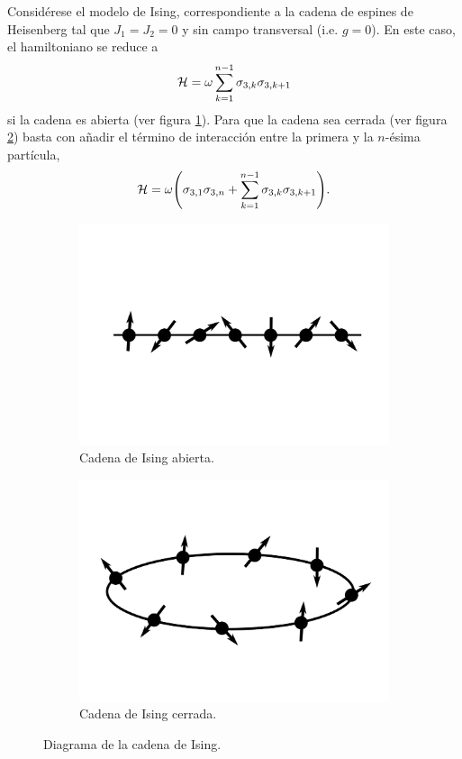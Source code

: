 Considérese el modelo de Ising, correspondiente a la cadena de espines de Heisenberg tal que $J_{1}=J_{2}=0$ y sin campo transversal (i.e. $g=0$). En este caso, el hamiltoniano se reduce a
\begin{equation}
    \mathcal{H}=\omega\sum_{k=1}^{n-1}\sigma_{3,k}\sigma_{3,k+1}\nonumber
\end{equation}
si la cadena es abierta (ver figura \ref{fig:IsingChainOpen}). Para que la cadena sea cerrada (ver figura \ref{fig:IsingChainClosed}) basta con añadir el término de interacción entre la primera y la $n$-ésima partícula,
\begin{equation}
    \mathcal{H}=\omega\qty(\sigma_{3,1}\sigma_{3,n}+\sum_{k=1}^{n-1}\sigma_{3,k}\sigma_{3,k+1}).\nonumber
\end{equation}
\begin{figure}[ht!]
    \centering
    \begin{subfigure}{0.5\textwidth}
      \centering
      \includegraphics[width=0.7\linewidth]{chapter4/figures_special/OpenIsing.png}
      \caption{Cadena de Ising abierta. \label{fig:IsingChainOpen}}
    \end{subfigure}%
    \begin{subfigure}{0.5\textwidth}
      \centering
      \includegraphics[width=0.7\linewidth]{chapter4/figures_special/ClosedIsing.png}
      \caption{Cadena de Ising cerrada. \label{fig:IsingChainClosed}}
    \end{subfigure}
    \caption{Diagrama de la cadena de Ising. \label{fig:IsingChainOpenAndClosed}}
    
\end{figure}
